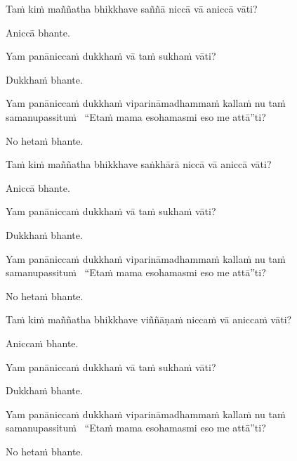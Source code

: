 \begin{pali-hang}
  Taṁ kiṁ maññatha bhikkhave saññā niccā vā aniccā vāti?
\end{pali-hang}
\begin{pali-hangtogether}
  Aniccā bhante.
\end{pali-hangtogether}
\begin{pali-hangtogether}
  Yam panāniccaṁ dukkhaṁ vā taṁ sukhaṁ vāti?
\end{pali-hangtogether}
\begin{pali-hangtogether}
  Dukkhaṁ bhante.
\end{pali-hangtogether}
\begin{pali-hangtogether}
  Yam panāniccaṁ dukkhaṁ viparināmadhammaṁ kallaṁ nu taṁ samanupassituṁ \breathmark\ ``Etaṁ mama esohamasmi eso me attā''ti?
\end{pali-hangtogether}
\begin{pali-hangtogether}
  No hetaṁ bhante.
\end{pali-hangtogether}

\begin{pali-hang}
  Taṁ kiṁ maññatha bhikkhave saṅkhārā niccā vā aniccā vāti?
\end{pali-hang}
\begin{pali-hangtogether}
  Aniccā bhante.
\end{pali-hangtogether}
\begin{pali-hangtogether}
  Yam panāniccaṁ dukkhaṁ vā taṁ sukhaṁ vāti?
\end{pali-hangtogether}
\begin{pali-hangtogether}
  Dukkhaṁ bhante.
\end{pali-hangtogether}
\begin{pali-hangtogether}
  Yam panāniccaṁ dukkhaṁ viparināmadhammaṁ kallaṁ nu taṁ samanupassituṁ \breathmark\ ``Etaṁ mama esohamasmi eso me attā''ti?
\end{pali-hangtogether}
\begin{pali-hangtogether}
  No hetaṁ bhante.
\end{pali-hangtogether}

\begin{pali-hang}
  Taṁ kiṁ maññatha bhikkhave viññāṇaṁ niccaṁ vā aniccaṁ vāti?
\end{pali-hang}
\begin{pali-hangtogether}
  Aniccaṁ bhante.
\end{pali-hangtogether}
\begin{pali-hangtogether}
  Yam panāniccaṁ dukkhaṁ vā taṁ sukhaṁ vāti?
\end{pali-hangtogether}
\begin{pali-hangtogether}
  Dukkhaṁ bhante.
\end{pali-hangtogether}
\begin{pali-hangtogether}
  Yam panāniccaṁ dukkhaṁ viparināmadhammaṁ kallaṁ nu taṁ samanupassituṁ \breathmark\ ``Etaṁ mama esohamasmi eso me attā''ti?
\end{pali-hangtogether}
\begin{pali-hangtogether}
  No hetaṁ bhante.
\end{pali-hangtogether}

